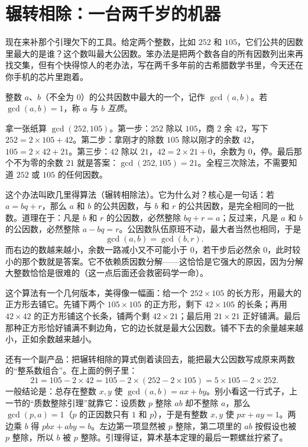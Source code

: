 \section{辗转相除：一台两千岁的机器}

现在来补那个引理欠下的工具。给定两个整数，比如 $252$ 和 $105$，它们公共的因数里最大的是谁？这个数叫最大公因数。笨办法是把两个数各自的所有因数列出来再找交集，但有个快得惊人的老办法，写在两千多年前的古希腊数学书里，今天还在你手机的芯片里跑着。

\begin{dingyi}[最大公因数]
整数 $a$、$b$（不全为 $0$）的公共因数中最大的一个，记作 $\gcd(a,b)$。若 $\gcd(a,b)=1$，称 $a$ 与 $b$ \emph{互质}。
\end{dingyi}

\begin{shiyan}
拿一张纸算 $\gcd(252,105)$。第一步：$252$ 除以 $105$，商 $2$ 余 $42$，写下 $252=2\times105+42$。第二步：拿刚才的除数 $105$ 除以刚才的余数 $42$，$105=2\times42+21$。第三步：$42$ 除以 $21$，$42=2\times21+0$，余数为 $0$，停。最后那个不为零的余数 $21$ 就是答案：$\gcd(252,105)=21$。全程三次除法，不需要知道 $252$ 或 $105$ 的任何因数。
\end{shiyan}

这个办法叫欧几里得算法（辗转相除法）。它为什么对？核心是一句话：若 $a=bq+r$，那么 $a$ 和 $b$ 的公共因数，与 $b$ 和 $r$ 的公共因数，是完全相同的一批数。道理在于：凡是 $b$ 和 $r$ 的公因数，必然整除 $bq+r=a$；反过来，凡是 $a$ 和 $b$ 的公因数，必然整除 $a-bq=r$。公因数队伍原班不动，最大者当然也相同，于是
\[
\gcd(a,b)=\gcd(b,r).
\]
而右边的数越来越小，余数一路减小又不可能小于 $0$，若干步后必然余 $0$，此时较小的那个数就是答案。它不依赖质因数分解——这恰恰是它强大的原因，因为分解大整数恰恰是很难的（这一点后面还会救密码学一命）。

这个算法有一个几何版本，美得像一幅画：给一个 $252\times 105$ 的长方形，用最大的正方形去铺它。先铺下两个 $105\times 105$ 的正方形，剩下 $42\times 105$ 的长条；再用 $42\times 42$ 的正方形铺这个长条，铺两个剩 $42\times 21$；最后用 $21\times 21$ 正好铺满。最后那种正方形恰好铺满不剩边角，它的边长就是最大公因数。铺不下去的余量越来越小，正如余数越来越小。

还有一个副产品：把辗转相除的算式倒着读回去，能把最大公因数写成原来两数的“整系数组合”。在上面的例子里：
\[
21=105-2\times42=105-2\times(252-2\times105)=5\times105-2\times252.
\]
一般结论是：总存在整数 $x,y$ 使 $\gcd(a,b)=ax+by$。别小看这一行式子，上一节的“质数整除引理”就靠它：设质数 $p$ 整除 $ab$ 却不整除 $a$，那么 $\gcd(p,a)=1$（$p$ 的正因数只有 $1$ 和 $p$），于是有整数 $x,y$ 使 $px+ay=1$。两边乘 $b$ 得 $pbx+aby=b$。左边第一项显然被 $p$ 整除，第二项里的 $ab$ 按假设也被 $p$ 整除，所以 $b$ 被 $p$ 整除。引理得证，算术基本定理的最后一颗螺丝拧紧了。


